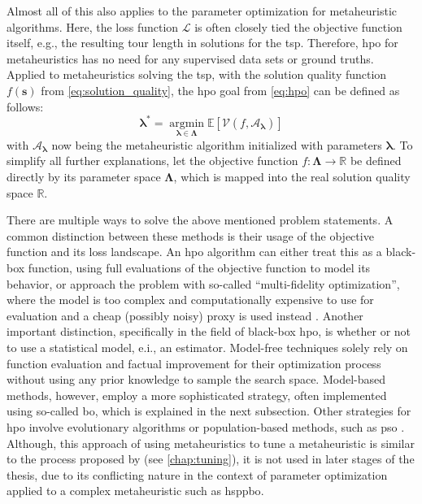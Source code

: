 Almost all of this also applies to the parameter optimization for metaheuristic algorithms. Here, the loss function $\mathcal{L}$ is often closely tied the objective function itself, e.g., the resulting tour length in solutions for the \gls{tsp}. Therefore, \gls{hpo} for metaheuristics has no need for any supervised data sets or ground truths. Applied to metaheuristics solving the \gls{tsp}, with the solution quality function $f(\mathbf{s})$ from \cref{eq:solution_quality}, the \gls{hpo} goal from \cref{eq:hpo} can be defined as follows:
\begin{equation}
	\label{eq:hpo-meta}
	\mathbf{\lambda^*} = \operatorname*{argmin}_{\mathbf{\lambda} \in \mathbf{\Lambda}} \mathbb{E} \left[ \mathcal{V}(f, \mathcal{A}_\mathbf{\lambda}) \right] 
\end{equation}
with $\mathcal{A}_\mathbf{\lambda}$ now being the metaheuristic algorithm initialized with parameters $\mathbf{\lambda}$. To simplify all further explanations, let the objective function $f: \mathcal{\mathbf{\Lambda}} \to \mathbb{R}$ be defined directly by its parameter space $\mathcal{\mathbf{\Lambda}}$, which is mapped into the real solution quality space $\mathbb{R}$.

There are multiple ways to solve the above mentioned problem statements. A common distinction between these methods is their usage of the objective function and its loss landscape. An \gls{hpo} algorithm can either treat this as a black-box function, using full evaluations of the objective function to model its behavior, or approach the problem with so-called \enquote{multi-fidelity optimization}, where the model is too complex and computationally expensive to use for evaluation and a cheap (possibly noisy) proxy is used instead \cite{feurer2019hyperparameter}. Another important distinction, specifically in the field of black-box \gls{hpo}, is whether or not to use a statistical model, e.i., an estimator. Model-free techniques solely rely on function evaluation and factual improvement for their optimization process without using any prior knowledge to sample the search space. Model-based methods, however, employ a more sophisticated strategy, often implemented using so-called \gls{bo}, which is explained in the next subsection. Other strategies for \gls{hpo} involve evolutionary algorithms or population-based methods, such as \gls{pso} \cite{yang2020hyperparameter}. Although, this approach of using metaheuristics to tune a metaheuristic is similar to the process proposed by \cite{talbi2009metaheuristics} (see \cref{chap:tuning}), it is not used in later stages of the thesis, due to its conflicting nature in the context of parameter optimization applied to a complex metaheuristic such as \gls{hsppbo}.

